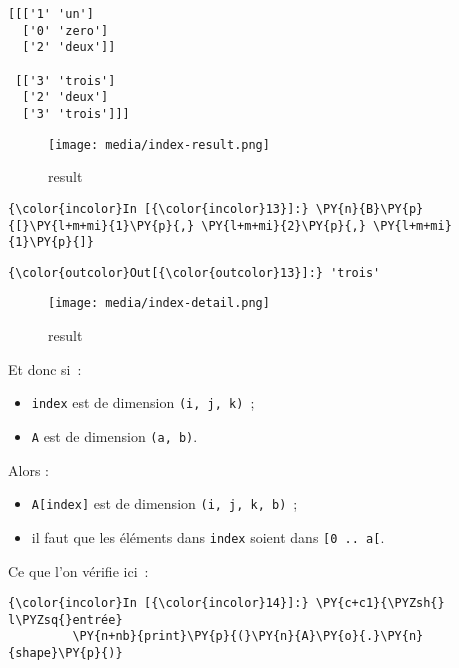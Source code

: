     \begin{Verbatim}[commandchars=\\\{\}]
[[['1' 'un']
  ['0' 'zero']
  ['2' 'deux']]

 [['3' 'trois']
  ['2' 'deux']
  ['3' 'trois']]]

    \end{Verbatim}

    \begin{figure}
\centering
\texttt{[image: media/index-result.png]}
\caption{result}
\end{figure}

    \begin{Verbatim}[commandchars=\\\{\}]
{\color{incolor}In [{\color{incolor}13}]:} \PY{n}{B}\PY{p}{[}\PY{l+m+mi}{1}\PY{p}{,} \PY{l+m+mi}{2}\PY{p}{,} \PY{l+m+mi}{1}\PY{p}{]}
\end{Verbatim}


\begin{Verbatim}[commandchars=\\\{\}]
{\color{outcolor}Out[{\color{outcolor}13}]:} 'trois'
\end{Verbatim}
            
    \begin{figure}
\centering
\texttt{[image: media/index-detail.png]}
\caption{result}
\end{figure}

    Et donc si~:

\begin{itemize}
\tightlist
\item
  \texttt{index} est de dimension \texttt{(i,\ j,\ k)}~;
\item
  \texttt{A} est de dimension \texttt{(a,\ b)}.
\end{itemize}

Alors :

\begin{itemize}
\tightlist
\item
  \texttt{A{[}index{]}} est de dimension \texttt{(i,\ j,\ k,\ b)}~;
\item
  il faut que les éléments dans \texttt{index} soient dans
  \texttt{{[}0\ ..\ a{[}}.
\end{itemize}

    Ce que l'on vérifie ici~:

    \begin{Verbatim}[commandchars=\\\{\}]
{\color{incolor}In [{\color{incolor}14}]:} \PY{c+c1}{\PYZsh{} l\PYZsq{}entrée}
         \PY{n+nb}{print}\PY{p}{(}\PY{n}{A}\PY{o}{.}\PY{n}{shape}\PY{p}{)}
\end{Verbatim}


